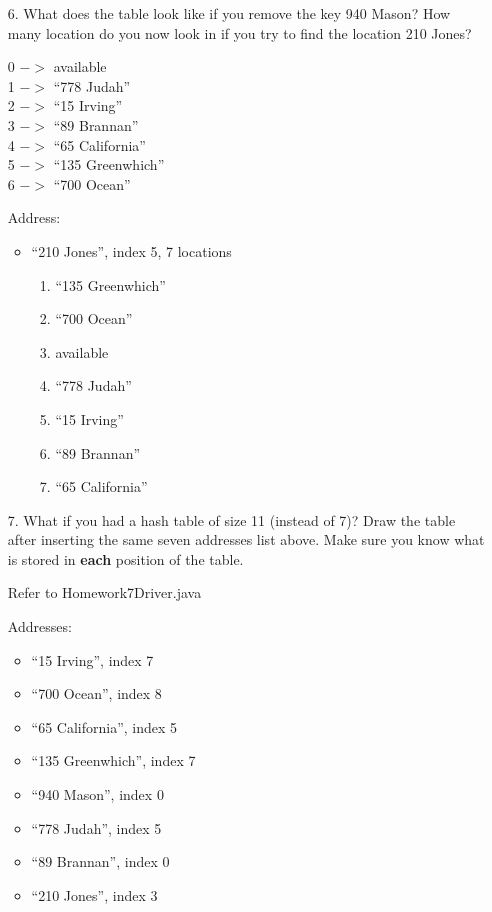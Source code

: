 \documentclass[10pt]{article}
\begin{document}
\begin{enumerate}
		\item[6.] What does the table look like if you remove the key 940 Mason? How many location do you now look in if you try to find the location 210 Jones?
			
			\vspace{0.5cm}
			0 $->$ available\\
			1 $->$ ``778 Judah''\\
			2 $->$ ``15 Irving''\\
			3 $->$ ``89 Brannan''\\
			4 $->$ ``65 California''\\
			5 $->$ ``135 Greenwhich''\\
			6 $->$ ``700 Ocean''
			
			\vspace{0.5cm}
			Address:
			\begin{itemize}
				\item ``210 Jones'', index 5, 7 locations
					\begin{enumerate}
						\item ``135 Greenwhich''
						\item ``700 Ocean''
						\item available
						\item ``778 Judah''
						\item ``15 Irving''
						\item ``89 Brannan''
						\item ``65 California''
					\end{enumerate}
			\end{itemize}
		
		\item[7.] What if you had a hash table of size 11 (instead of 7)? Draw the table after inserting the same seven addresses list above. Make sure you know what is stored in \textbf{each} position of the table.
			
			\vspace{0.5cm}
			Refer to Homework7Driver.java
			
			\vspace{0.5cm}
			Addresses:
			\begin{itemize}
				\item ``15 Irving'', index 7
				\item ``700 Ocean'', index 8
				\item ``65 California'', index 5
				\item ``135 Greenwhich'', index 7
				\item ``940 Mason'', index 0
				\item ``778 Judah'', index 5
				\item ``89 Brannan'', index 0
				\item ``210 Jones'', index 3
			\end{itemize}
			

\end{enumerate}
\end{document}
